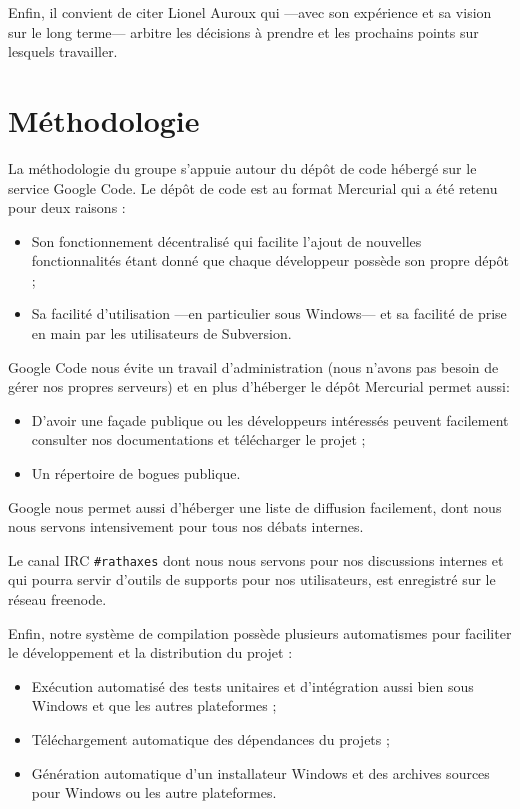 \documentclass[francais]{rtxreport}
\begin{document}
Enfin, il convient de citer Lionel Auroux qui ---avec son expérience et sa vision
sur le long terme--- arbitre les décisions à prendre et les prochains points sur
lesquels travailler.

\section{Méthodologie}

La méthodologie du groupe s'appuie autour du dépôt de code hébergé sur le
service Google Code. Le dépôt de code est au format Mercurial qui a été retenu
pour deux raisons :
\begin{itemize}
\item Son fonctionnement décentralisé qui facilite l'ajout de nouvelles
fonctionnalités étant donné que chaque développeur possède son propre dépôt ;
\item Sa facilité d'utilisation ---en particulier sous Windows--- et sa facilité
de prise en main par les utilisateurs de Subversion.
\end{itemize}

Google Code nous évite un travail d'administration (nous n'avons pas besoin de
gérer nos propres serveurs) et en plus d'héberger le dépôt Mercurial permet
aussi:
\begin{itemize}
\item D'avoir une façade publique ou les développeurs intéressés peuvent
facilement consulter nos documentations et télécharger le projet ;
\item Un répertoire de bogues publique.
\end{itemize}
Google nous permet aussi d'héberger une liste de diffusion facilement, dont nous
nous servons intensivement pour tous nos débats internes.

Le canal IRC \texttt{\#rathaxes} dont nous nous servons pour nos discussions
internes et qui pourra servir d'outils de supports pour nos utilisateurs, est
enregistré sur le réseau freenode.

Enfin, notre système de compilation possède plusieurs automatismes pour
faciliter le développement et la distribution du projet :
\begin{itemize}
\item Exécution automatisé des tests unitaires et d'intégration aussi bien sous
Windows et que les autres plateformes ;
\item Téléchargement automatique des dépendances du projets ;
\item Génération automatique d'un installateur Windows et des archives sources
pour Windows ou les autre plateformes.
\end{itemize}
\end{document}
